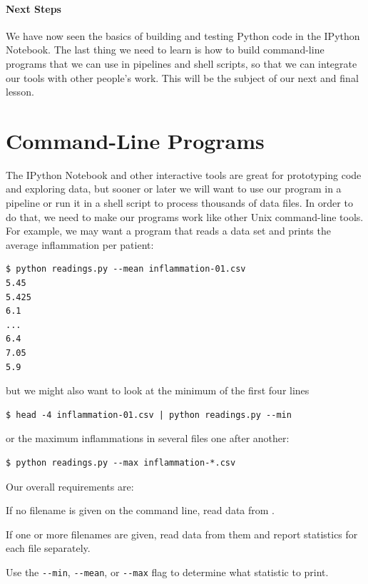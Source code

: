 \documentclass{book}
\begin{document}
\mbox{}\paragraph{Next Steps}

We have now seen the basics of building and testing Python code in the
IPython Notebook. The last thing we need to learn is how to build
command-line programs that we can use in pipelines and shell scripts, so
that we can integrate our tools with other people's work. This will be
the subject of our next and final lesson.

\section{Command-Line Programs}

The IPython Notebook and other interactive tools are great for
prototyping code and exploring data, but sooner or later we will want to
use our program in a pipeline or run it in a shell script to process
thousands of data files. In order to do that, we need to make our
programs work like other Unix command-line tools. For example, we may
want a program that reads a data set and prints the average inflammation
per patient:

\begin{verbatim}
$ python readings.py --mean inflammation-01.csv
5.45
5.425
6.1
...
6.4
7.05
5.9
\end{verbatim}

but we might also want to look at the minimum of the first four lines

\begin{verbatim}
$ head -4 inflammation-01.csv | python readings.py --min
\end{verbatim}

or the maximum inflammations in several files one after another:

\begin{verbatim}
$ python readings.py --max inflammation-*.csv
\end{verbatim}

Our overall requirements are:

\begin{swcenumerate}
\item
  If no filename is given on the command line, read data from
  .
\item
  If one or more filenames are given, read data from them and report
  statistics for each file separately.
\item
  Use the \texttt{-{}-min}, \texttt{-{}-mean}, or \texttt{-{}-max} flag
  to determine what statistic to print.
\end{swcenumerate}
\end{document}
